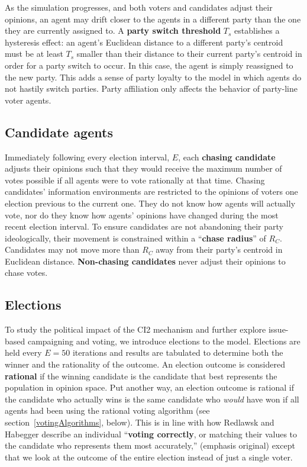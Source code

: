 As the simulation progresses, and both voters and candidates adjust their
opinions, an agent may drift closer to the agents in a different party than the
one they are currently assigned to. A \textbf{party switch threshold} $T_s$
establishes a hysteresis effect: an agent's Euclidean distance to a different party's
centroid must be at least $T_s$ smaller than their distance to their current
party's centroid in order for a party switch to occur. In this case, the agent
is simply reassigned to the new party. This adds a sense of party loyalty to the model
in which agents do not hastily switch parties. Party affiliation only affects
the behavior of party-line voter agents.



\subsection{Candidate agents}

Immediately following every election interval, $E$, each \textbf{chasing candidate} adjusts
their opinions such that they would receive the maximum number of votes
possible if all agents were to vote rationally at that time. Chasing
candidates' information environments are restricted to the opinions of voters
one election previous to the current one. They do not know how agents will
actually vote, nor do they know how agents' opinions have changed during the
most recent election interval. To ensure candidates are not abandoning their
party ideologically, their movement is constrained within a ``\textbf{chase
radius}'' of $R_C$. Candidates may not move more than $R_C$ away from their party's centroid in Euclidean distance. \textbf{Non-chasing
candidates} never adjust their opinions to chase votes.


\subsection{Elections}

To study the political impact of the CI2 mechanism and further explore
issue-based campaigning and voting, we introduce elections to the model.
Elections are held every $E=50$ iterations and results are tabulated to
determine both the winner and the rationality of the outcome. An election
outcome is considered \textbf{rational} if the winning candidate is the
candidate that best represents the population in opinion space. Put another
way, an election outcome is rational if the candidate who actually wins is the
same candidate who \textit{would} have won if all agents had been using the
rational voting algorithm (see section~\ref{votingAlgorithms}, below). This is
in line with how Redlawsk and Habegger describe an individual ``\textbf{voting
correctly}, or matching their values to the candidate who represents them most
accurately,''\cite[p.8]{redlawsk_citizens_2020} (emphasis original) except that
we look at the outcome of the entire election instead of just a single voter.


